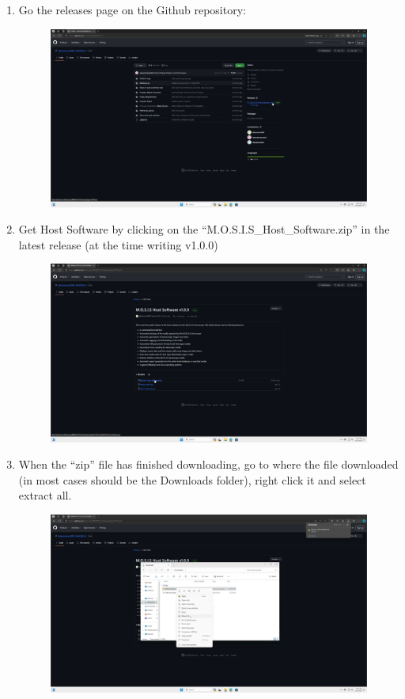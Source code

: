 \documentclass[12pt]{article}
\begin{document}
\begin{center}
\begin{enumerate}
\begin{figure}[H]
		      \end{figure}
		\item Go the releases page on the Github repository:
		      \begin{figure}[H]
			      \includegraphics[width=\textwidth]{Figures/Windows-Go-To-Releases.png}
		      \end{figure}
		\item Get Host Software by clicking on the ``M.O.S.I.S\_Host\_Software.zip'' in the latest release (at the time writing v1.0.0)
		      \begin{figure}[H]
			      \includegraphics[width=\textwidth]{Figures/Windows-Get-Host-Software.png}
		      \end{figure}
		\item When the ``zip'' file has finished downloading, go to where the file downloaded (in most cases should be the Downloads folder), right click it and select extract all.
		      \begin{figure}[H]
			      \includegraphics[width=\textwidth]{Figures/Windows-Extract-Archive.png}

\end{figure}
\end{enumerate}
\end{center}
\end{document}
